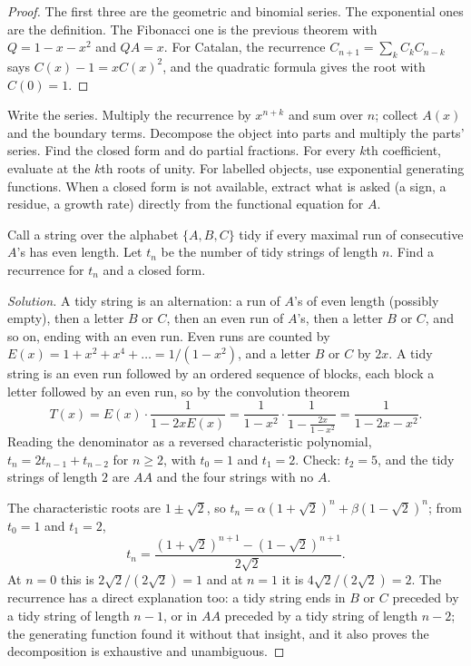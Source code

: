 \begin{proof}
The first three are the geometric and binomial series. The exponential ones are the definition. The Fibonacci one is the previous theorem with $Q=1-x-x^2$ and $QA=x$. For Catalan, the recurrence $C_{n+1}=\sum_kC_kC_{n-k}$ says $C(x)-1=xC(x)^2$, and the quadratic formula gives the root with $C(0)=1$.
\end{proof}

\begin{firstmoves}
Write the series. Multiply the recurrence by $x^{n+k}$ and sum over $n$; collect $A(x)$ and the boundary terms. Decompose the object into parts and multiply the parts' series. Find the closed form and do partial fractions. For every $k$th coefficient, evaluate at the $k$th roots of unity. For labelled objects, use exponential generating functions. When a closed form is not available, extract what is asked (a sign, a residue, a growth rate) directly from the functional equation for $A$.
\end{firstmoves}

\begin{example}
Call a string over the alphabet $\{A,B,C\}$ tidy if every maximal run of consecutive $A$'s has even length. Let $t_n$ be the number of tidy strings of length $n$. Find a recurrence for $t_n$ and a closed form.
\end{example}

\begin{proof}[Solution]
A tidy string is an alternation: a run of $A$'s of even length (possibly empty), then a letter $B$ or $C$, then an even run of $A$'s, then a letter $B$ or $C$, and so on, ending with an even run. Even runs are counted by $E(x)=1+x^2+x^4+\dots=1/(1-x^2)$, and a letter $B$ or $C$ by $2x$. A tidy string is an even run followed by an ordered sequence of blocks, each block a letter followed by an even run, so by the convolution theorem
\[
T(x)=E(x)\cdot\frac{1}{1-2xE(x)}=\frac{1}{1-x^2}\cdot\frac{1}{1-\frac{2x}{1-x^2}}=\frac{1}{1-2x-x^2}.
\]
Reading the denominator as a reversed characteristic polynomial, $t_n=2t_{n-1}+t_{n-2}$ for $n\ge2$, with $t_0=1$ and $t_1=2$. Check: $t_2=5$, and the tidy strings of length $2$ are $AA$ and the four strings with no $A$.

The characteristic roots are $1\pm\sqrt2$, so $t_n=\alpha(1+\sqrt2)^n+\beta(1-\sqrt2)^n$; from $t_0=1$ and $t_1=2$,
\[
t_n=\frac{(1+\sqrt2)^{n+1}-(1-\sqrt2)^{n+1}}{2\sqrt2}.
\]
At $n=0$ this is $2\sqrt2/(2\sqrt2)=1$ and at $n=1$ it is $4\sqrt2/(2\sqrt2)=2$. The recurrence has a direct explanation too: a tidy string ends in $B$ or $C$ preceded by a tidy string of length $n-1$, or in $AA$ preceded by a tidy string of length $n-2$; the generating function found it without that insight, and it also proves the decomposition is exhaustive and unambiguous.
\end{proof}

